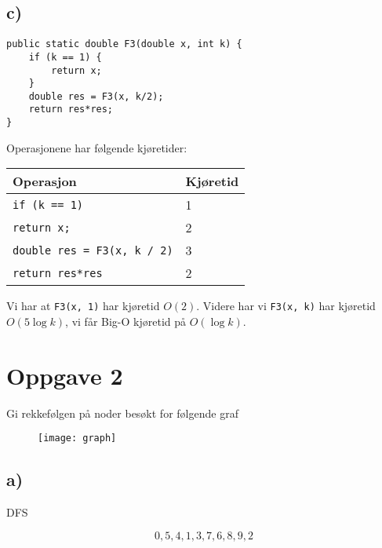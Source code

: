 \documentclass{article}
\begin{document}
    \subsection{c)}
    \begin{lstlisting}
public static double F3(double x, int k) {
    if (k == 1) {
        return x;
    }
    double res = F3(x, k/2);
    return res*res;
}
    \end{lstlisting}    

    \begin{ans}
Operasjonene har følgende kjøretider:

\begin{table}[H]
    \begin{center}
        \begin{tabular}[c]{|l|l|}
            \hline
             Operasjon& Kjøretid  \\
            \hline
             \texttt{if (k == 1)}& 1  \\
             \texttt{return x;} & 2  \\
             \texttt{double res = F3(x, k / 2)}& 3 \\
             \texttt{return res*res}& 2  \\
            \hline
        \end{tabular}
    \end{center}
\end{table}

Vi har at \texttt{F3(x, 1)} har kjøretid \( O(2) \). Videre har vi \texttt{F3(x, k)} har kjøretid \( O(5\log k)\), vi får Big-O kjøretid på \( O(\log k) \).
    \end{ans}


    \section{Oppgave 2}

    Gi rekkefølgen på noder besøkt for følgende graf

    \begin{figure}[H]
        \begin{center}
            \texttt{[image: graph]}
        \end{center}
    \end{figure}

    \subsection{a)}
    \begin{ans}
        DFS

        \[ 0,5,4,1,3,7,6,8,9,2 \]
    \end{ans}
\end{document}
